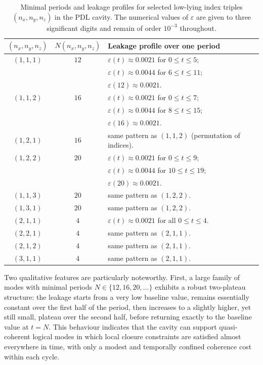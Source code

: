 \documentclass{article}
\theoremstyle{definition}
\begin{document}
\begin{table}[h]
\centering
\begin{tabular}{ccl}
\hline
$(n_x,n_y,n_z)$ & $N(n_x,n_y,n_z)$ & Leakage profile over one period \\
\hline
$(1,1,1)$ & $12$ & $\varepsilon(t) \approx 0.0021$ for $0 \le t \le 5$; \\
          &      & $\varepsilon(t) \approx 0.0044$ for $6 \le t \le 11$; \\
          &      & $\varepsilon(12) \approx 0.0021$. \\
$(1,1,2)$ & $16$ & $\varepsilon(t) \approx 0.0021$ for $0 \le t \le 7$; \\
          &      & $\varepsilon(t) \approx 0.0044$ for $8 \le t \le 15$; \\
          &      & $\varepsilon(16) \approx 0.0021$. \\
$(1,2,1)$ & $16$ & same pattern as $(1,1,2)$ (permutation of indices). \\
$(1,2,2)$ & $20$ & $\varepsilon(t) \approx 0.0021$ for $0 \le t \le 9$; \\
          &      & $\varepsilon(t) \approx 0.0044$ for $10 \le t \le 19$; \\
          &      & $\varepsilon(20) \approx 0.0021$. \\
$(1,1,3)$ & $20$ & same pattern as $(1,2,2)$. \\
$(1,3,1)$ & $20$ & same pattern as $(1,2,2)$. \\
$(2,1,1)$ & $4$  & $\varepsilon(t) \approx 0.0021$ for all $0 \le t \le 4$. \\
$(2,2,1)$ & $4$  & same pattern as $(2,1,1)$. \\
$(2,1,2)$ & $4$  & same pattern as $(2,1,1)$. \\
$(3,1,1)$ & $4$  & same pattern as $(2,1,1)$. \\
\hline
\end{tabular}
\caption{Minimal periods and leakage profiles for selected low-lying index triples $(n_x,n_y,n_z)$ in the PDL cavity. The numerical values of $\varepsilon$ are given to three significant digits and remain of order $10^{-3}$ throughout.\cite{Effective_Fields_PDL_2026,Exponent_18_PDL_2026}}
\label{tab:low_modes}
\end{table}

Two qualitative features are particularly noteworthy. First, a large family of modes with minimal periods $N \in \{12,16,20,\dots\}$ exhibits a robust two-plateau structure: the leakage starts from a very low baseline value, remains essentially constant over the first half of the period, then increases to a slightly higher, yet still small, plateau over the second half, before returning exactly to the baseline value at $t = N$.\cite{Effective_Fields_PDL_2026,Exponent_18_PDL_2026} This behaviour indicates that the cavity can support quasi-coherent logical modes in which local closure constraints are satisfied almost everywhere in time, with only a modest and temporally confined coherence cost within each cycle.
\end{document}
